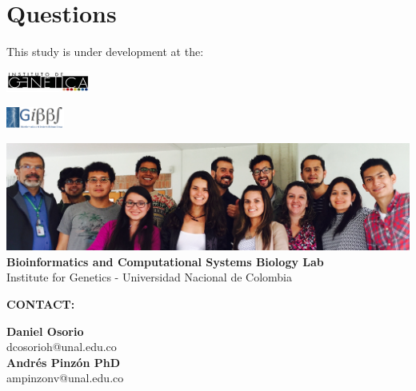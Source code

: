 \documentclass[11pt]{beamer}
\begin{document}
\section{Questions}
\begin{frame}{This study is under development at the:}
\begin{multicols}{2}
\includegraphics[height=0.7cm]{logoIG}
\begin{flushright}
\includegraphics[height=0.7cm]{logoGIBBS}
\end{flushright}
\end{multicols}
\begin{center}
\includegraphics[width=\textwidth]{GIBBS}\\
\textbf{Bioinformatics and Computational Systems Biology Lab}\\
Institute for Genetics - Universidad Nacional de Colombia
\end{center}
\begin{center}
\textbf{CONTACT:}
\begin{multicols}{2}
\begin{center}
\textbf{Daniel Osorio}\\
dcosorioh@unal.edu.co\\
\textbf{Andrés Pinzón PhD}\\
ampinzonv@unal.edu.co
\end{center}
\end{multicols}
\end{center}
\end{frame}
\end{document}
